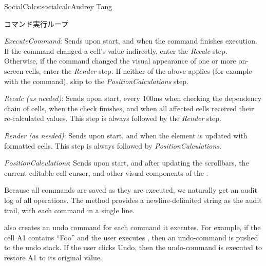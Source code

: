 \begin{aosachapter}{SocialCalc}{s:socialcalc}{Audrey Tang}
\begin{aosasect1}{コマンド実行ループ}
\begin{aosadescription}

  \item{\emph{ExecuteCommand}}: Sends  upon start, and
    when the command finishes execution.  If the command
   changed a cell's value indirectly, enter the \emph{Recalc} step.
   Otherwise, if the command changed the visual appearance of one or
   more on-screen cells, enter the \emph{Render} step.  If neither of
   the above applies (for example with the  command), skip
   to the \emph{PositionCalculations} step.

\pagebreak

  \item{\emph{Recalc}} \emph{(as{ }needed)}: Sends  upon start,
   every 100ms when checking the dependency chain of
  cells,  when the check finishes, and
   when all affected cells received their
  re-calculated values.  This step is always followed by the \emph{Render}
  step.

  \item{\emph{Render}} \emph{(as{ }needed)}: Sends  upon
  start, and  when the
   element is updated with
  formatted cells. This step is always followed by \emph{PositionCalculations}.

  \item{\emph{PositionCalculations}}: Sends  upon
  start, and  after updating the scrollbars, the
  current editable cell cursor, and other visual components of the
  .

\end{aosadescription}

Because all commands are saved as they are executed, we naturally get
an audit log of all operations.  The 
method provides a newline-delimited string as the audit trail, with
each command in a single line.

 also creates an undo command for each
command it executes.  For example, if the cell A1 contains ``Foo''
and the user executes , then an undo-command
 is pushed to the undo stack.  If the user
clicks Undo, then the undo-command is executed to restore A1 to its
original value.

\end{aosasect1}


\end{aosachapter}
